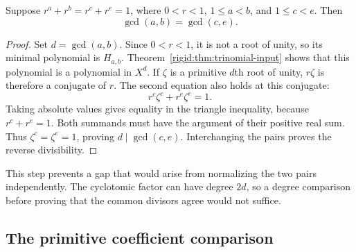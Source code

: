 \begin{lemma}
\label{rigid:lem:intrinsic-gcd}
Suppose $r^a+r^b=r^c+r^e=1$, where $0<r<1$,
$1\le a<b$, and $1\le c<e$.  Then
\[
\gcd(a,b)=\gcd(c,e).
\]
\end{lemma}

\begin{proof}
Set $d=\gcd(a,b)$.  Since $0<r<1$, it is not a root of unity, so
its minimal polynomial is $H_{a,b}$.  Theorem~\ref{rigid:thm:trinomial-input}
shows that this polynomial is a polynomial in $X^d$.  If $\zeta$ is a
primitive $d$th root of unity, $r\zeta$ is therefore a conjugate of $r$.
The second equation also holds at this conjugate:
\[
r^c\zeta^c+r^e\zeta^e=1.
\]
Taking absolute values gives equality in the triangle inequality,
because $r^c+r^e=1$.  Both summands must have the argument of their
positive real sum.  Thus $\zeta^c=\zeta^e=1$, proving
$d\mid\gcd(c,e)$.  Interchanging the pairs proves the reverse
divisibility.
\end{proof}

This step prevents a gap that would arise from normalizing the two
pairs independently.  The cyclotomic factor can have degree $2d$,
so a degree comparison before proving that the common divisors agree
would not suffice.

\subsection{The primitive coefficient comparison}

